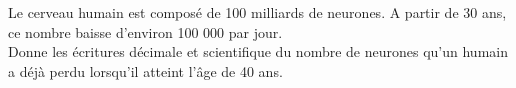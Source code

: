 %
%
Le cerveau humain est composé de 100 milliards de neurones. A partir de 30 ans, ce nombre baisse d'environ 100 000 par jour. \\
	Donne les écritures décimale et scientifique du nombre de neurones qu'un humain a déjà perdu lorsqu'il atteint l'âge de 40 ans.

